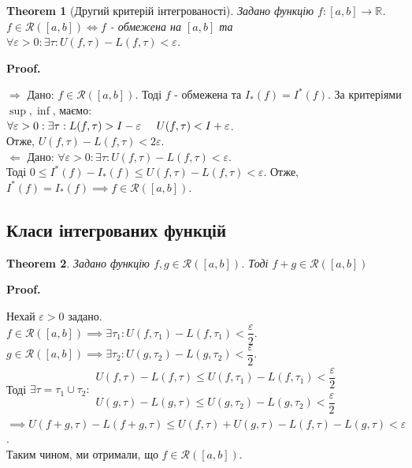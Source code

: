 \documentclass[a4paper, 10pt]{article}
\makeatletter
\def\qed{$\blacksquare$}
\def\rightproof{$\boxed{\Rightarrow}$ }
\def\leftproof{$\boxed{\Leftarrow}$ }
\theoremstyle{theoremdd}
\newtheorem{theorem}{Theorem}[subsection]
\theoremstyle{theoremdd}
\theoremstyle{theoremdd}
\theoremstyle{theoremdd}
\theoremstyle{theoremdd}
\theoremstyle{theoremdd}
\theoremstyle{theoremdd}
\theoremstyle{theoremdd}
\renewenvironment{proof}[1][Proof.\\]{\par
\pushQED{\hfill \qed}%
\normalfont \topsep6\p@\@plus6\p@\relax
\trivlist
\item\relax
{\bfseries
#1\@addpunct{.}}\hspace\labelsep\ignorespaces
}{%
\popQED\endtrivlist\@endpefalse
}
\makeatother
\begin{document}
\begin{theorem}[Другий критерій інтегрованості]
Задано функцію $f: [a,b] \to \mathbb{R}$.\\
$f \in \mathcal{R}([a,b]) \iff f$ - обмежена на $[a,b]$ та $\forall \varepsilon > 0: \exists \tau: U(f,\tau) - L(f,\tau) < \varepsilon$.
\end{theorem}

\begin{proof}
\rightproof Дано: $f \in \mathcal{R}([a,b])$. Тоді $f$ - обмежена та $I_*(f)=I^*(f)$. За критеріями $\sup,\inf$, маємо:\\
$\forall \varepsilon > 0: \exists \tau: L(f,\tau) > I - \varepsilon \hspace{0.5cm} U(f,\tau) < I + \varepsilon$.\\
Отже, $U(f,\tau) - L(f,\tau) < 2\varepsilon$.
\bigskip \\
\leftproof Дано: $\forall \varepsilon > 0: \exists \tau: U(f, \tau) - L(f,\tau) < \varepsilon$.\\
Тоді $0 \leq I^*(f) - I_*(f) \leq U(f, \tau) - L(f,\tau) < \varepsilon$. Отже, $I^*(f) = I_*(f) \implies f \in \mathcal{R}([a,b])$.
\end{proof}

\subsection{Класи інтегрованих функцій}
\begin{theorem}
Задано функцію $f,g \in \mathcal{R}([a,b])$. Тоді $f+g \in \mathcal{R}([a,b])$
\end{theorem}

\begin{proof}
Нехай $\varepsilon > 0$ задано.\\
$f \in \mathcal{R}([a,b]) \implies \exists \tau_1: U(f,\tau_1) - L(f,\tau_1) < \dfrac{\varepsilon}{2}$.\\
$g \in \mathcal{R}([a,b]) \implies \exists \tau_2: U(g,\tau_2) - L(g,\tau_2) < \dfrac{\varepsilon}{2}$.\\
Тоді $\exists \tau = \tau_1 \cup \tau_2: \begin{gathered} U(f,\tau)-L(f,\tau) \leq U(f,\tau_1)-L(f,\tau_1) < \dfrac{\varepsilon}{2} \\
U(g,\tau)-L(g,\tau) \leq U(g,\tau_2) - L(g,\tau_2) < \dfrac{\varepsilon}{2} \end{gathered}$\\
$\implies U(f+g,\tau) - L(f+g,\tau) \leq U(f,\tau) + U(g,\tau) - L(f,\tau) - L(g,\tau) < \varepsilon$.\\
Таким чином, ми отримали, що $f \in \mathcal{R}([a,b])$.
\end{proof}
\end{document}
